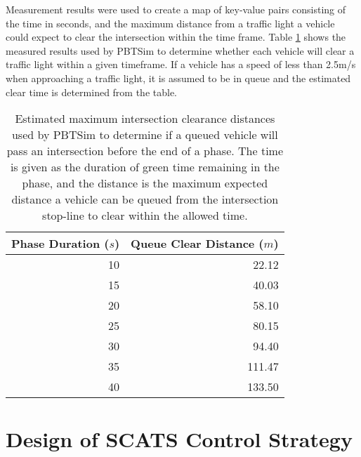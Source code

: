 Measurement results were used to create a map of key-value pairs consisting of the time in seconds, and the maximum distance from a traffic light a vehicle could expect to clear the intersection within the time frame. Table \ref{vehiclecleardistances} shows the measured results used by PBTSim to determine whether each vehicle will clear a traffic light within a given timeframe. If a vehicle has a speed of less than 2.5m/s when approaching a traffic light, it is assumed to be in queue and the estimated clear time is determined from the table.

\begin{table}[]
\begin{center}
\begin{tabular}{rr}
\toprule
Phase Duration ($s$) & Queue Clear Distance ($m$) \\
\midrule
10 & 22.12 \\
15 & 40.03 \\
20 & 58.10 \\
25 & 80.15 \\
30 & 94.40 \\
35 & 111.47 \\
40 & 133.50 \\
\bottomrule
\end{tabular}
\end{center}
\caption{ Estimated maximum intersection clearance distances used by PBTSim to determine if a queued vehicle will pass an intersection before the end of a phase. The time is given as the duration of green time remaining in the phase, and the distance is the maximum expected distance a vehicle can be queued from the intersection stop-line to clear within the allowed time. }
\label{vehiclecleardistances}
\end{table}

\section{Design of SCATS Control Strategy}
\label{sec:scats_strategy}

